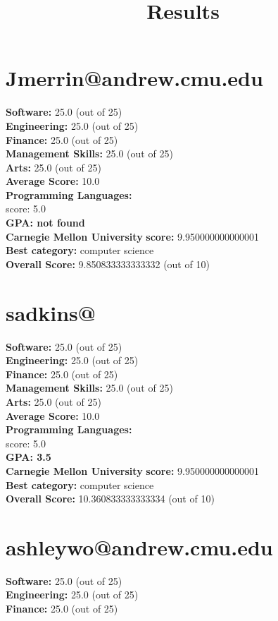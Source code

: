 \documentclass{article}
\title{Results}
\begin{document}
\section{Jmerrin@andrew.cmu.edu}
\textbf{Software:} 25.0 (out of 25)\\
    \textbf{Engineering: } 25.0 (out of 25)\\
    \textbf{Finance:} 25.0 (out of 25)\\
    \textbf{Management Skills:} 25.0 (out of 25)\\
    \textbf{Arts:} 25.0 (out of 25)\\
\textbf{Average Score: } 10.0\\
\textbf{Programming Languages:} \\
score: 5.0\\
\textbf{GPA: not found}\\
\textbf{Carnegie Mellon University} \textbf{score:} 9.950000000000001\\
\textbf{Best category: } computer science\\
    \textbf{Overall Score: }9.850833333333332 (out of 10)\section{sadkins@}
\textbf{Software:} 25.0 (out of 25)\\
    \textbf{Engineering: } 25.0 (out of 25)\\
    \textbf{Finance:} 25.0 (out of 25)\\
    \textbf{Management Skills:} 25.0 (out of 25)\\
    \textbf{Arts:} 25.0 (out of 25)\\
\textbf{Average Score: } 10.0\\
\textbf{Programming Languages:} \\
score: 5.0\\
\textbf{GPA: 3.5}\\
\textbf{Carnegie Mellon University} \textbf{score:} 9.950000000000001\\
\textbf{Best category: } computer science\\
    \textbf{Overall Score: }10.360833333333334 (out of 10)\section{ashleywo@andrew.cmu.edu}
\textbf{Software:} 25.0 (out of 25)\\
    \textbf{Engineering: } 25.0 (out of 25)\\
    \textbf{Finance:} 25.0 (out of 25)\\
\end{document}
